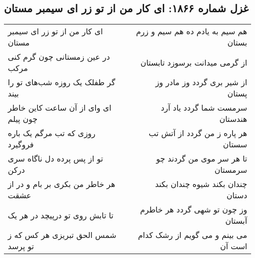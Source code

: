 \begin{center}
\section*{غزل شماره ۱۸۶۶: ای کار من از تو زر ای سیمبر مستان}
\label{sec:1866}
\begin{longtable}{l p{0.5cm} r}
ای کار من از تو زر ای سیمبر مستان
&&
هم سیم به یادم ده هم سیم و زرم بستان
\\
در عین زمستانی چون گرم کنی مرکب
&&
از گرمی میدانت برسوزد تابستان
\\
گر طفلک یک روزه شب‌های تو را بیند
&&
از شیر بری گردد وز مادر وز پستان
\\
ای وای از آن ساعت کاین خاطر چون پیلم
&&
سرمست شما گردد یاد آرد هندستان
\\
روزی که تب مرگم یک باره فروگیرد
&&
هر پاره ز من گردد از آتش تب سستان
\\
تو از پس پرده دل ناگاه سری درکن
&&
تا هر سر موی من گردند چو سرمستان
\\
هر خاطر من بکری بر بام و در از عشقت
&&
چندان بکند شیوه چندان بکند دستان
\\
تا تابش روی تو درپیچد در هر یک
&&
وز چون تو شهی گردد هر خاطرم آبستان
\\
شمس الحق تبریزی هر کس که ز تو پرسد
&&
می بینم و می گویم از رشک کدام است آن
\\
\end{longtable}
\end{center}
